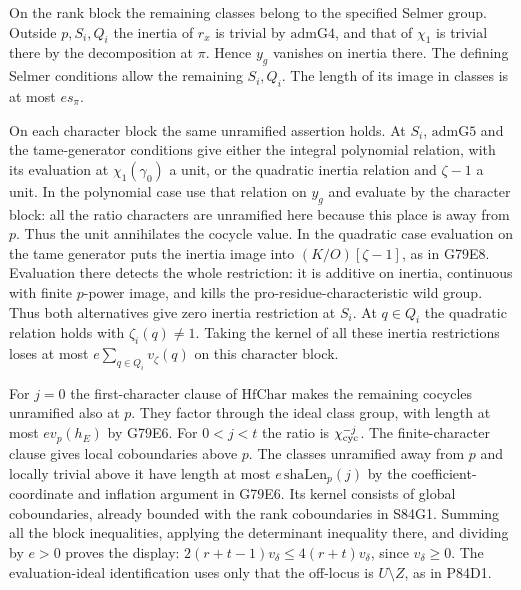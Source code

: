 On the rank block the remaining classes belong to the
specified Selmer group. Outside $p,S_i,Q_i$ the inertia of
$r_x$ is trivial by $\mathrm{admG4}$, and that of $\chi_1$ is
trivial there by the decomposition at $\pi$. Hence $y_g$
vanishes on inertia there. The defining Selmer conditions
allow the remaining $S_i,Q_i$. The length of its image in
classes is at most $e s_\pi$.

On each character block the same unramified assertion holds.
At $S_i$, $\mathrm{admG5}$ and the tame-generator conditions
give either the integral polynomial relation, with its
evaluation at $\chi_1(\gamma_0)$ a unit, or the quadratic
inertia relation and $\zeta-1$ a unit. In the polynomial
case use that relation on $y_g$ and evaluate by the character
block: all the ratio characters are unramified here because
this place is away from $p$. Thus the unit annihilates the
cocycle value. In the quadratic case evaluation on the
tame generator puts the inertia image into $(K/O)[\zeta-1]$,
as in G79E8. Evaluation there detects the whole restriction:
it is additive on inertia, continuous with finite $p$-power
image, and kills the pro-residue-characteristic wild group.
Thus both alternatives give zero inertia restriction at $S_i$.
At $q\in Q_i$ the quadratic relation holds with
$\zeta_i(q)\ne1$. Taking the kernel of all these inertia
restrictions loses at most $e\sum_{q\in Q_i}v_\zeta(q)$
on this character block.

For $j=0$ the first-character clause of $\mathrm{HfChar}$
makes the remaining cocycles unramified also at $p$.
They factor through the ideal class group, with length at
most $e v_p(h_E)$ by G79E6. For $0<j<t$ the ratio is
$\chi_{\rm cyc}^{-j}$. The finite-character clause gives
local coboundaries above $p$. The classes unramified away
from $p$ and locally trivial above it have length at most
$e\,\mathrm{shaLen}_p(j)$ by the coefficient-coordinate
and inflation argument in G79E6. Its kernel consists of
global coboundaries, already bounded with the rank coboundaries
in S84G1. Summing all the block inequalities, applying the
determinant inequality there, and dividing by $e>0$ proves
the display: $2(r+t-1)v_\delta\le4(r+t)v_\delta$, since
$v_\delta\ge0$. The evaluation-ideal identification uses
only that the off-locus is $U\setminus Z$, as in P84D1.

